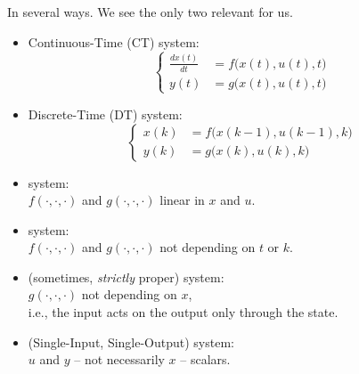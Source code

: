 \begin{frame}
\myPause
In several ways. We see the only two relevant for us.\myPause
\begin{itemize}[<+-| alert@+>]
\item Continuous-Time (CT) system:\\
      \begin{displaymath}
       \left\{
        \begin{array}{rl}
         \frac{dx(t)}{dt} &= f \big( x(t),u(t),t  \big) \\
         y(t)             &= g \big( x(t),u(t),t  \big)
        \end{array}
       \right.
      \end{displaymath}
\item Discrete-Time (DT) system:\\
      \begin{displaymath}
       \left\{
        \begin{array}{rl}
         x(k) &= f \big( x(k-1),u(k-1),k  \big) \\
         y(k) &= g \big( x(k),u(k),k  \big)
        \end{array}
       \right.
      \end{displaymath}

\end{itemize}
\end{frame}

\begin{frame}
\myPause
\begin{itemize}[<+-| alert@+>]
\item {} system:\\
      $f(\cdot,\cdot,\cdot)$ and $g(\cdot,\cdot,\cdot)$ linear in $x$ and $u$.
\item {} system:\\
      $f(\cdot,\cdot,\cdot)$ and $g(\cdot,\cdot,\cdot)$ not depending on $t$ or $k$.
\item {} (sometimes, \emph{strictly} proper) system:\\
      $g(\cdot,\cdot,\cdot)$ not depending on $x$,\\
      i.e., the input acts on the output only through the state.
\item {} (Single-Input, Single-Output) system:\\
      $u$ and $y$ -- not necessarily $x$ -- scalars.
\end{itemize}
\end{frame}

